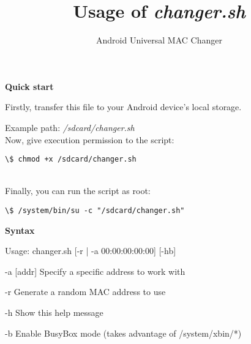 \documentclass[12pt]{article}
\title{\textbf{Usage of \textit{changer.sh}}}
\author{Android Universal MAC Changer}
\date{}
\begin{document}
\maketitle

\begin{center}
  \Large\textbf{Quick start} \\
\end{center}

Firstly, transfer this file to your Android device's local storage.

Example path: \textit{/sdcard/changer.sh} \\

Now, give execution permission to the script:

\begin{lstlisting}
\$ chmod +x /sdcard/changer.sh
\end{lstlisting} \\

Finally, you can run the script as root:

\begin{lstlisting}
\$ /system/bin/su -c "/sdcard/changer.sh"
\end{lstlisting}

\begin{center}
  \Large\textbf{Syntax} \\
\end{center}

Usage: changer.sh [-r | -a 00:00:00:00:00] [-hb] \\

\begin{list_type}  
  \item -a [addr] \quad Specify a specific address to work with
  \item -r \quad \quad \quad \quad Generate a random MAC address to use
  \item -h \quad \quad \quad \quad Show this help message
  \item -b \quad \quad \quad \quad Enable BusyBox mode (takes advantage of /system/xbin/*)
\end{list_type}
\end{document}
